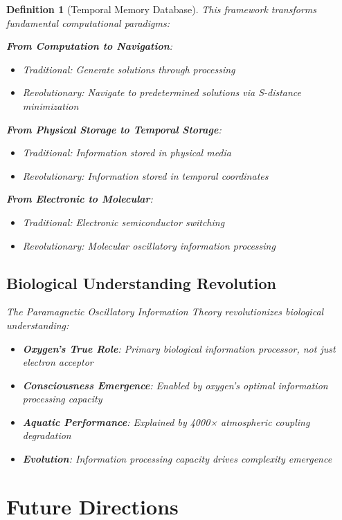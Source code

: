 \documentclass[12pt]{article}
\newtheorem{definition}[theorem]{Definition}
\begin{document}
\begin{definition}[Temporal Memory Database]
This framework transforms fundamental computational paradigms:

\textbf{From Computation to Navigation}:
\begin{itemize}
\item Traditional: Generate solutions through processing
\item Revolutionary: Navigate to predetermined solutions via S-distance minimization
\end{itemize}

\textbf{From Physical Storage to Temporal Storage}:
\begin{itemize}
\item Traditional: Information stored in physical media
\item Revolutionary: Information stored in temporal coordinates  
\end{itemize}

\textbf{From Electronic to Molecular}:
\begin{itemize}
\item Traditional: Electronic semiconductor switching
\item Revolutionary: Molecular oscillatory information processing
\end{itemize}

\subsection{Biological Understanding Revolution}

The Paramagnetic Oscillatory Information Theory revolutionizes biological understanding:

\begin{itemize}
\item \textbf{Oxygen's True Role}: Primary biological information processor, not just electron acceptor
\item \textbf{Consciousness Emergence}: Enabled by oxygen's optimal information processing capacity
\item \textbf{Aquatic Performance}: Explained by 4000× atmospheric coupling degradation
\item \textbf{Evolution}: Information processing capacity drives complexity emergence
\end{itemize}

\section{Future Directions}


\end{definition}
\end{document}
